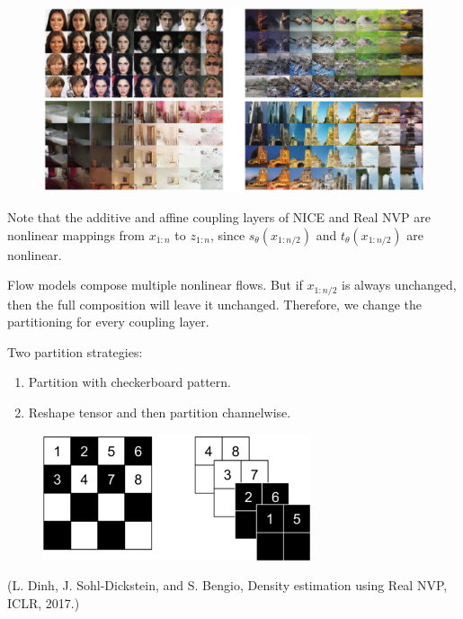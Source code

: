 \begin{figure}[H]
    \centering
    \includegraphics[width=1.0\textwidth]{.././assets/10.14.png}
\end{figure}

\par\noindent\textcolor{gray}{\hdashrule{\textwidth}{0.4pt}{1pt 2pt}}

\begin{concept}
    Note that the additive and affine coupling layers of NICE and Real NVP are nonlinear mappings from $x_{1: n}$ to $z_{1: n}$, since $s_{\theta}\left(x_{1: n / 2}\right)$ and $t_{\theta}\left(x_{1: n / 2}\right)$ are nonlinear.

    Flow models compose multiple nonlinear flows. But if $x_{1: n / 2}$ is always unchanged, then the full composition will leave it unchanged. Therefore, we change the partitioning for every coupling layer.
\end{concept}

\begin{concept}
    Two partition strategies:

    \begin{enumerate}
        \item Partition with checkerboard pattern.
        \item Reshape tensor and then partition channelwise.
    \end{enumerate}

    \begin{figure}[H]
        \centering
        \includegraphics[width=0.7\textwidth]{.././assets/10.15.png}
    \end{figure}

    (L. Dinh, J. Sohl-Dickstein, and S. Bengio, Density estimation using Real NVP, ICLR, 2017.)
\end{concept}


